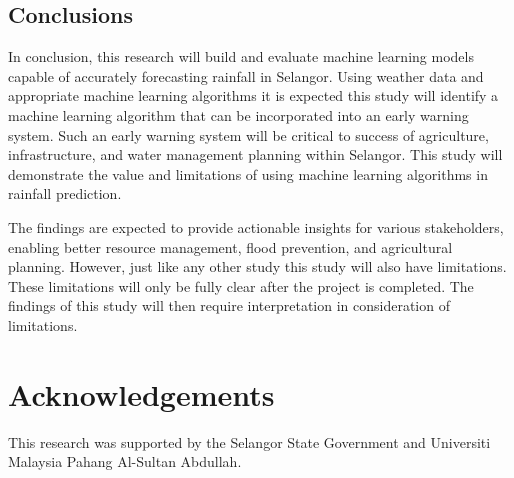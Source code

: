 \documentclass{article}
\begin{document}
\subsection{Conclusions}

In conclusion, this research will build and evaluate machine learning models capable of
accurately forecasting rainfall in Selangor. Using weather data and appropriate machine
learning algorithms it is expected this study will identify a machine learning algorithm that can
be incorporated into an early warning system. Such an early warning system will be critical to
success of agriculture, infrastructure, and water management planning within Selangor. This
study will demonstrate the value and limitations of using machine learning algorithms in
rainfall prediction.

The findings are expected to provide actionable insights for various stakeholders, enabling
better resource management, flood prevention, and agricultural planning. However, just like
any other study this study will also have limitations. These limitations will only be fully clear
after the project is completed. The findings of this study will then require interpretation in
consideration of limitations.

\section*{Acknowledgements}
This research was supported by the Selangor State Government and Universiti Malaysia Pahang Al-Sultan Abdullah.



\end{document}
